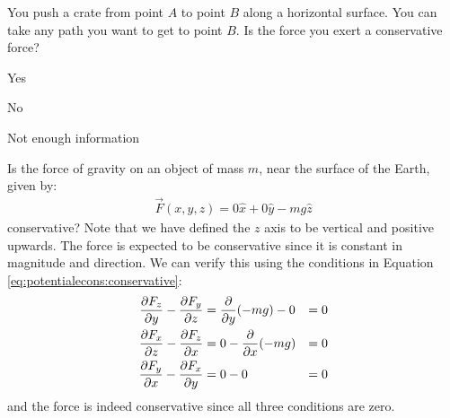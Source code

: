 \begin{checkpoint}
\begin{MCquestion}{You push a crate from point $A$ to point $B$ along a horizontal surface. You can take any path you want to get to point $B$. Is the force you exert a conservative force?}
\item Yes
\item No \correct
\item Not enough information
\end{MCquestion}
\end{checkpoint}

\begin{example}{\label{ex:potentialecons:gravity}Is the force of gravity on an object of mass $m$, near the surface of the Earth, given by:
\begin{align*}
\vec F(x,y,z) =0\hat x + 0\hat y -mg \hat z
\end{align*}
conservative? Note that we have defined the $z$ axis to be vertical and positive upwards.}
The force is expected to be conservative since it is constant in magnitude and direction. We can verify this using the conditions in Equation \ref{eq:potentialecons:conservative}:
\begin{align*}
\frac{\partial F_z}{\partial y}-\frac{\partial F_y}{\partial z} &= \frac{\partial }{\partial y}(-mg) - 0 &= 0\\
\frac{\partial F_x}{\partial z}-\frac{\partial F_z}{\partial x} &= 0 - \frac{\partial }{\partial x}(-mg) &= 0\\
\frac{\partial F_y}{\partial x}-\frac{\partial F_x}{\partial y} &= 0 - 0 &=0
\end{align*}
and the force is indeed conservative since all three conditions are zero.
\end{example}


